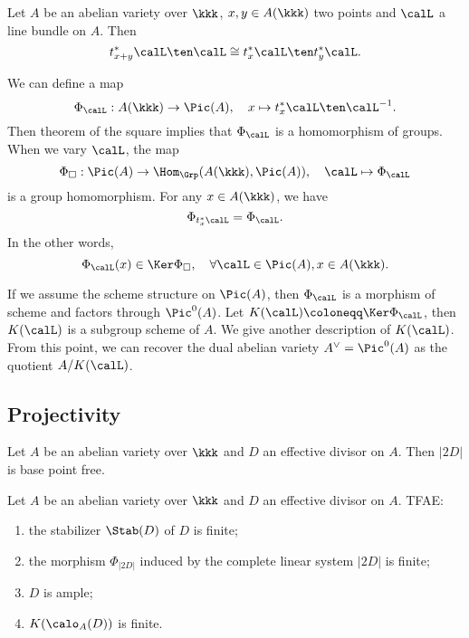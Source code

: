     \begin{theorem}\label{thm: theorem of the square}
        Let \(A\) be an abelian variety over \(\kkk\), \(x,y \in A(\kkk)\) two points and \(\calL\) a line bundle on \(A\).
        Then 
        \[ t_{x+y}^*\calL \ten \calL \cong t_x^*\calL \ten t_y^*\calL. \]
    \end{theorem}

    \begin{remark}\label{rmk: theorem of the square and homomorphism to Picard group}
        We can define a map
        \[ \Phi_\calL: A(\kkk) \to \Pic(A), \quad x \mapsto t_x^*\calL \ten \calL^{-1}. \]
        Then theorem of the square implies that \(\Phi_\calL\) is a homomorphism of groups.
        When we vary \(\calL\), the map 
        \[ \Phi_{\square}: \Pic(A) \to \Hom_{\Grp}(A(\kkk), \Pic(A)), \quad \calL \mapsto \Phi_\calL \]
        is a group homomorphism.
        For any \(x \in A(\kkk)\), we have
        \[ \Phi_{t_x^*\calL} = \Phi_\calL. \]
        In the other words, 
        \[ \Phi_\calL(x) \in \Ker \Phi_{\square}, \quad \forall \calL \in \Pic(A), x \in A(\kkk). \]
    \end{remark}

    If we assume the scheme structure on \(\Pic(A)\), then \(\Phi_\calL\) is a morphism of scheme and factors through \(\Pic^0(A)\).
    Let \(K(\calL) \coloneqq \Ker \Phi_\calL\), then \(K(\calL)\) is a subgroup scheme of \(A\).
    We give another description of \(K(\calL)\).
    From this point, we can recover the dual abelian variety \(A^\vee = \Pic^0(A)\) as the quotient \(A/K(\calL)\).


    


\subsection{Projectivity}

    \begin{proposition}\label{prop:2D_is_base_point_free}
        Let \(A\) be an abelian variety over \(\kkk\) and \(D\) an effective divisor on \(A\).
        Then \(|2D|\) is base point free.
    \end{proposition}

    \begin{theorem}\label{thm:ample_criteria_for_abelian_varieties}
        Let \(A\) be an abelian variety over \(\kkk\) and \(D\) an effective divisor on \(A\).
        TFAE:
        \begin{enumerate}
            \item the stabilizer \(\Stab(D)\) of \(D\) is finite;
            \item the morphism \(\Phi_{|2D|}\) induced by the complete linear system \(|2D|\) is finite;
            \item \(D\) is ample;
            \item \(K(\calo_A(D))\) is finite.
        \end{enumerate}
    \end{theorem}

